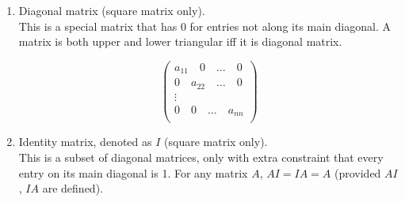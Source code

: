 \documentclass[11pt,a4paper]{article}
\begin{document}
\begin{enumerate}
\item Diagonal matrix (square matrix only).\\
This is a special matrix that has 0 for entries not along its main diagonal. A matrix is both upper and lower triangular iff it is diagonal matrix.

 \[\left( \begin{array}{cccc}
a_{11} \quad 0 \quad \ldots\quad 0\\
0 \quad a_{22} \quad \ldots\quad 0\\
\vdots\\
0 \quad 0 \quad \ldots\quad a_{nn}\\
\end{array} \right)\]

\item Identity matrix, denoted as $I$ (square matrix only).\\
This is a subset of diagonal matrices, only with extra constraint that every entry on its main diagonal is 1. For any matrix $A$, $AI=IA=A$ (provided $AI$, $IA$ are defined).

\end{enumerate}
\end{document}

